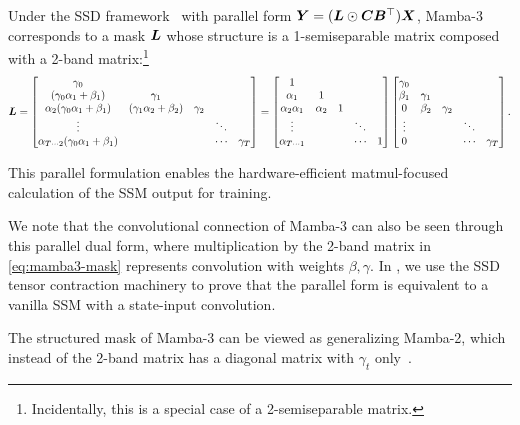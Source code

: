 Under the SSD framework~ with parallel form ${\bm{Y}} = ({\bm{L}} \odot {\bm{C}} {{\bm{B}}}^{\top}){\bm{X}}$,
Mamba-3 corresponds to a mask ${\bm{L}}$ whose structure is a 1-semiseparable matrix composed with a 2-band matrix:\footnote{Incidentally, this is a special case of a 2-semiseparable matrix.}
\begin{align}
{\bm{L}} =
    \begin{bmatrix}
    \gamma_0 & & & \\
    (\gamma_0\alpha_1 + \beta_1) & \gamma_1 & & \\
    \alpha_2(\gamma_0\alpha_1 + \beta_1) & (\gamma_1\alpha_2+\beta_2) & \gamma_2 & \\
    \vdots & & & \ddots \\
    \alpha_{T\cdots 2}(\gamma_0\alpha_1 + \beta_1) & & & \cdots & \gamma_T
    \end{bmatrix} =
    \begin{bmatrix}
    1 & & & \\
    \alpha_1 & 1 & & \\
    \alpha_2\alpha_1 & \alpha_2 & 1 & \\
    \vdots & & & \ddots \\
    \alpha_{T\cdots 1} & & & \cdots & 1
    \end{bmatrix}
    \begin{bmatrix}
    \gamma_0 & & & \\
    \beta_1 & \gamma_1 & & \\
    0 & \beta_2 & \gamma_2 & \\
    \vdots & & & \ddots \\
    0 & & & \cdots & \gamma_T
    \end{bmatrix}.
    \label{eq:mamba3-mask}
\end{align}

This parallel formulation enables the hardware-efficient matmul-focused calculation of the SSM output for training. 

We note that the convolutional connection of Mamba-3 can also be seen through this parallel dual form, where multiplication by the 2-band matrix in \eqref{eq:mamba3-mask} represents convolution with weights $\beta, \gamma$.
In , we use the SSD tensor contraction machinery to prove that the parallel form is equivalent to a vanilla SSM with a state-input convolution.

\begin{remark}
    The structured mask of Mamba-3 can be viewed as generalizing Mamba-2, which instead of the 2-band matrix has a diagonal matrix with $\gamma_t$ only~.
\end{remark}
